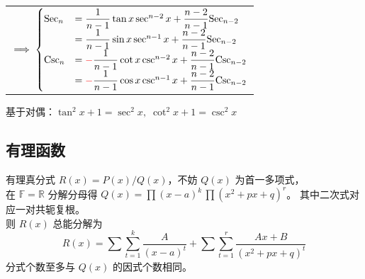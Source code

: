 \documentclass[12pt, a4paper, UTF8, openany]{ctexbook}
\newcommand{\field}[1]{\mathbb{#1}}%
\begin{document}
\begin{longtable}[h]{l}
            $\implies
            \begin{cases}
                \text{Sec}_n 
                    & = \dfrac{1}{n - 1} \tan x \sec^{n - 2} x + \dfrac{n - 2}{n - 1} \text{Sec}_{n - 2} \\
                    & = \dfrac{1}{n - 1} \sin x \sec^{n - 1} x + \dfrac{n - 2}{n - 1} \text{Sec}_{n - 2} \\
                \text{Csc}_n 
                    & = {\color{red}-}\dfrac{1}{n - 1} \cot x \csc^{n - 2} x + \dfrac{n - 2}{n - 1} \text{Csc}_{n - 2} \\
                    & = {\color{red}-}\dfrac{1}{n - 1} \cos x \csc^{n - 1} x + \dfrac{n - 2}{n - 1} \text{Csc}_{n - 2}
            \end{cases}$
        \end{longtable}

        基于对偶：$\tan^2 x + 1 = \sec^2 x, \; \cot^2 x + 1 = \csc^2 x$

        \subsection{有理函数}
        有理真分式 $R(x) = P(x) / Q(x)$，不妨 $Q(x)$ 为首一多项式，\\
        在 $\field{F} = \field{R}$ 分解分母得 $Q(x) = \prod (x - a)^{k} \, \prod (x^2 + px + q)^{r}$。
        其中二次式对应一对共轭复根。\\
        则 $R(x)$ 总能分解为 $$R(x) = \sum\sum_{t = 1}^k \frac{A}{(x - a)^t} + \sum\sum_{t = 1}^r \frac{Ax + B}{(x^2 + px + q)^t}$$
        分式个数至多与 $Q(x)$ 的因式个数相同。
\end{document}
